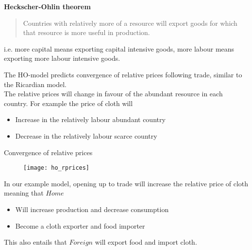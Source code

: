 \documentclass{beamer}
\begin{document}
\begin{frame}
  \textbf{Heckscher-Ohlin theorem}
  \begin{quote}
   Countries with relatively more of a resource will export goods for which that resource is more useful in production. 
  \end{quote}
  i.e. more capital means exporting capital intensive goods, more labour means exporting more labour intensive goods.
\end{frame}

\begin{frame}
  The HO-model predicts convergence of relative prices following trade, similar to the Ricardian model.\\
  The relative prices will change in favour of the abundant resource in each country.
  For example the price of cloth will
  \begin{itemize}
    \item Increase in the relatively labour abundant country
    \item Decrease in the relatively labour scarce country
  \end{itemize}
\end{frame}

\begin{frame}{Convergence of relative prices}
  \begin{figure}
    \texttt{[image: ho\_rprices]}
  \end{figure}
\end{frame}

\begin{frame}
  In our example model, opening up to trade will increase the relative price of cloth meaning that $Home$ 
  \begin{itemize}
    \item Will increase production and decrease consumption
    \item Become a cloth exporter and food importer
  \end{itemize}
  This also entails that $Foreign$ will export food and import cloth.
\end{frame}
\end{document}
